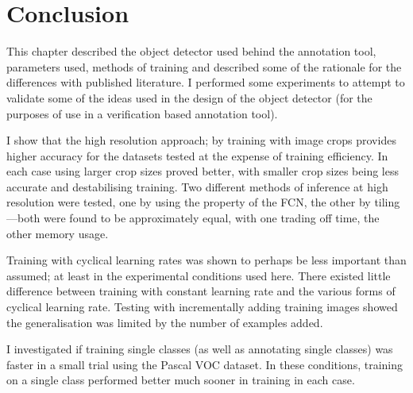 \section {Conclusion}

This chapter described the object detector used behind the annotation tool, parameters used, methods of training and described some of the rationale for the differences with published literature. I performed some experiments to attempt to validate some of the ideas used in the design of the object detector (for the purposes of use in a verification based annotation tool). 

I show that the high resolution approach; by training with image crops provides higher accuracy for the datasets tested at the expense of training efficiency. In each case using larger crop sizes proved better, with smaller crop sizes being less accurate and destabilising training. Two different methods of inference at high resolution were tested, one by using the property of the \gls{FCN}, the other by tiling---both were found to be approximately equal, with one trading off time, the other memory usage.

Training with cyclical learning rates was shown to perhaps be less important than assumed; at least in the experimental conditions used here. There existed little difference between training with constant learning rate and the various forms of cyclical learning rate. Testing with incrementally adding training images showed the generalisation was limited by the number of examples added.

I investigated if training single classes (as well as annotating single classes) was faster in a small trial using the Pascal VOC dataset. In these conditions, training on a single class performed better much sooner in training in each case.



